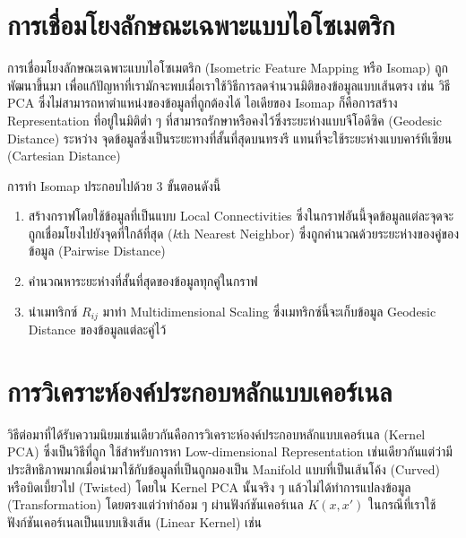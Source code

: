 \section{การเชื่อมโยงลักษณะเฉพาะแบบไอโซเมตริก}
\label{sec:isomap}

การเชื่อมโยงลักษณะเฉพาะแบบไอโซเมตริก (Isometric Feature Mapping หรือ Isomap)\autocite{tenenbaum2000} ถูกพัฒนาขึ้นมา%
เพื่อแก้ปัญหาที่เรามักจะพบเมื่อเราใช้วิธีการลดจำนวนมิติของข้อมูลแบบเส้นตรง เช่น วิธี PCA ซึ่งไม่สามารถหาตำแหน่งของข้อมูลที่ถูกต้องได้ ไอเดียของ 
Isomap ก็คือการสร้าง Representation ที่อยู่ในมิติต่ำ ๆ ที่สามารถรักษาหรือคงไว้ซึ่งระยะห่างแบบจีโอดีซิค (Geodesic Distance) ระหว่าง%
จุดข้อมูลซึ่งเป็นระยะทางที่สั้นที่สุดบนทรงรี แทนที่จะใช้ระยะห่างแบบคาร์ทีเซียน (Cartesian Distance)

การทำ Isomap ประกอบไปด้วย 3 ขั้นตอนดังนี้ 

\begin{enumerate}
    \item สร้างกราฟโดยใช้ข้อมูลที่เป็นแบบ Local Connectivities ซึ่งในกราฟอันนี้จุดข้อมูลแต่ละจุดจะถูกเชื่อมโยงไปยังจุดที่ใกล้ที่สุด 
    (\textit{k}th Nearest Neighbor) ซึ่งถูกคำนวณด้วยระยะห่างของคู่ของข้อมูล (Pairwise Distance)
    
    \item คำนวณหาระยะห่างที่สั้นที่สุดของข้อมูลทุกคู่ในกราฟ
    
    \item นำเมทริกซ์ $R_{ij}$ มาทำ Multidimensional Scaling ซึ่งเมทริกซ์นี้จะเก็บข้อมูล Geodesic Distance ของข้อมูลแต่ละคู่ไว้
\end{enumerate}

\section{การวิเคราะห์องค์ประกอบหลักแบบเคอร์เนล}
\label{sec:kernel_pca}

วิธีต่อมาที่ได้รับความนิยมเช่นเดียวกันคือการวิเคราะห์องค์ประกอบหลักแบบเคอร์เนล (Kernel PCA)\autocite{scholkopf1998} ซึ่งเป็นวิธีที่ถูก%
ใช้สำหรับการหา Low-dimensional Representation เช่นเดียวกันแต่ว่ามีประสิทธิภาพมากเมื่อนำมาใช้กับข้อมูลที่เป็นถูกมองเป็น Manifold 
แบบที่เป็นเส้นโค้ง (Curved) หรือบิดเบี้ยวไป (Twisted) โดยใน Kernel PCA นั้นจริง ๆ แล้วไม่ได้ทำการแปลงข้อมูล (Transformation) 
โดยตรงแต่ว่าทำอ้อม ๆ ผ่านฟังก์ชันเคอร์เนล $K(x,x')$ ในกรณีที่เราใช้ฟังก์ชันเคอร์เนลเป็นแบบเชิงเส้น (Linear Kernel) เช่น 

